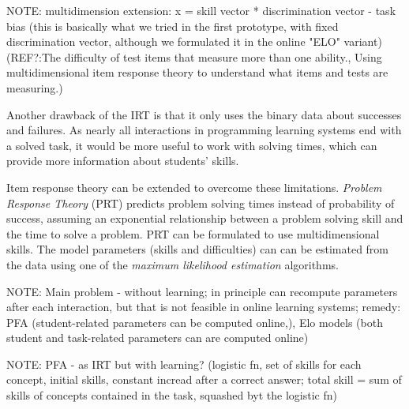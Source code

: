 NOTE: multidimension extension: x = skill vector * discrimination vector - task bias
(this is basically what we tried in the first prototype, with fixed discrimination vector,
although we formulated it in the online "ELO" variant)
(REF?:The difficulty of test items that measure more than one ability.,
Using multidimensional item response theory to understand what items and tests are measuring.)

Another drawback of the IRT is that it only uses
  the binary data about successes and failures.
As nearly all interactions in programming learning systems end with a solved task,
  it would be more useful to work with solving times,
  which can provide more information about students' skills.

Item response theory can be extended to overcome these limitations.
\emph{Problem Response Theory} (PRT)
\cite{alg.problem-response-theory, pelanek-student-modeling-times}
predicts problem solving times instead of probability of success,
assuming an exponential relationship between a problem solving skill
and the time to solve a problem.
PRT can be formulated to use multidimensional skills.
The model parameters (skills and difficulties) can can be estimated from the data
  using one of the \emph{maximum likelihood estimation} algorithms.



NOTE: Main problem - without learning; in principle can recompute parameters after
each interaction, but that is not feasible in online learning systems; remedy: PFA (student-related parameters can be computed online,), Elo models (both student and task-related parameters can are computed online)


NOTE: PFA - as IRT but with learning? (logistic fn, set of skills for each concept, initial skills, constant incread after a correct answer; total skill = sum of skills of concepts contained in the task, squashed byt the logistic fn)

